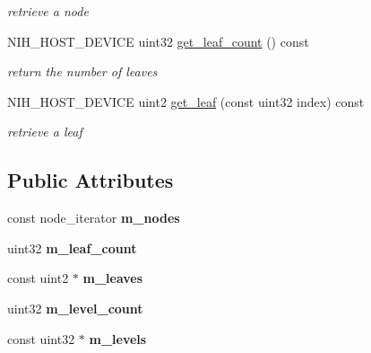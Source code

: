 \begin{DoxyCompactItemize}
\begin{DoxyCompactList}\small\item\em retrieve a node \end{DoxyCompactList}\item 
\hypertarget{structnih_1_1_b_f_tree_acd4c65c4ddff86d0dbb3d57ac10f754e}{
\-N\-I\-H\-\_\-\-H\-O\-S\-T\-\_\-\-D\-E\-V\-I\-C\-E uint32 \hyperlink{structnih_1_1_b_f_tree_acd4c65c4ddff86d0dbb3d57ac10f754e}{get\-\_\-leaf\-\_\-count} () const }
\label{structnih_1_1_b_f_tree_acd4c65c4ddff86d0dbb3d57ac10f754e}

\begin{DoxyCompactList}\small\item\em return the number of leaves \end{DoxyCompactList}\item 
\hypertarget{structnih_1_1_b_f_tree_a7990e513530c87c5f315895d160093ad}{
\-N\-I\-H\-\_\-\-H\-O\-S\-T\-\_\-\-D\-E\-V\-I\-C\-E uint2 \hyperlink{structnih_1_1_b_f_tree_a7990e513530c87c5f315895d160093ad}{get\-\_\-leaf} (const uint32 index) const }
\label{structnih_1_1_b_f_tree_a7990e513530c87c5f315895d160093ad}

\begin{DoxyCompactList}\small\item\em retrieve a leaf \end{DoxyCompactList}\end{DoxyCompactItemize}
\subsection*{\-Public \-Attributes}
\begin{DoxyCompactItemize}
\item 
\hypertarget{structnih_1_1_b_f_tree_a207f6d738f623e63072604330cb2c4e0}{
const node\-\_\-iterator {\bfseries m\-\_\-nodes}}
\label{structnih_1_1_b_f_tree_a207f6d738f623e63072604330cb2c4e0}

\item 
\hypertarget{structnih_1_1_b_f_tree_a93a8187164cac6aa7173a923da46dc17}{
uint32 {\bfseries m\-\_\-leaf\-\_\-count}}
\label{structnih_1_1_b_f_tree_a93a8187164cac6aa7173a923da46dc17}

\item 
\hypertarget{structnih_1_1_b_f_tree_a2f205903e5befb20ffdb3a32ac9aaa89}{
const uint2 $\ast$ {\bfseries m\-\_\-leaves}}
\label{structnih_1_1_b_f_tree_a2f205903e5befb20ffdb3a32ac9aaa89}

\item 
\hypertarget{structnih_1_1_b_f_tree_ad94ee066a43eca1292650e128ec6e752}{
uint32 {\bfseries m\-\_\-level\-\_\-count}}
\label{structnih_1_1_b_f_tree_ad94ee066a43eca1292650e128ec6e752}

\item 
\hypertarget{structnih_1_1_b_f_tree_abd65c782cabd3d0512eafec85e116d5a}{
const uint32 $\ast$ {\bfseries m\-\_\-levels}}
\label{structnih_1_1_b_f_tree_abd65c782cabd3d0512eafec85e116d5a}

\end{DoxyCompactItemize}


